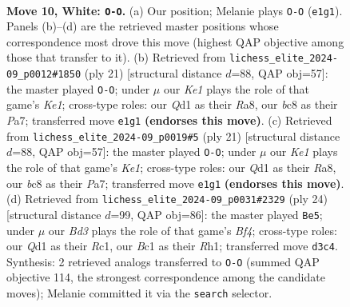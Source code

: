 \documentclass[11pt]{article}
\begin{document}
\clearpage

\begin{figure}[p]\centering
\begin{subfigure}{0.46\textwidth}\centering
\resizebox{\linewidth}{!}{%
\newchessgame
\chessboard[
  setfen={rnb2rk1/1p3ppp/p3pn2/3q4/1b6/2NBPN2/PP3PPP/R1BQK2R w KQ - 0 10},
  showmover=false,
  pgfstyle=straightmove, color=movearrow, markmove={e1-g1}
]}
\caption{}
\end{subfigure}\hfill
\begin{subfigure}{0.46\textwidth}\centering
\resizebox{\linewidth}{!}{%
\newchessgame
\chessboard[
  setfen={r3k2r/pp3ppp/1qn1p3/5b2/1b1P4/1Q2PN2/PP1B1PPP/R3KB1R b KQkq - 0 11},
  showmover=false,
  pgfstyle=straightmove, color=movearrow, markmove={e8-g8}
]}
\caption{}
\end{subfigure}
\\[4pt]
\begin{subfigure}{0.46\textwidth}\centering
\resizebox{\linewidth}{!}{%
\newchessgame
\chessboard[
  setfen={r3k2r/pp3ppp/1qn1p3/5b2/1b1P4/1Q2PN2/PP1B1PPP/R3KB1R b KQkq - 0 11},
  showmover=false,
  pgfstyle=straightmove, color=movearrow, markmove={e8-g8}
]}
\caption{}
\end{subfigure}\hfill
\begin{subfigure}{0.46\textwidth}\centering
\resizebox{\linewidth}{!}{%
\newchessgame
\chessboard[
  setfen={r1b2rk1/pp2ppbp/5np1/3n4/1q3B2/1NN1P3/PP1QBPPP/2R1K2R w K - 0 13},
  showmover=false,
  pgfstyle=straightmove, color=movearrow, markmove={f4-e5}
]}
\caption{}
\end{subfigure}
\caption{\textbf{Move 10, White: \texttt{O-O}.} (a) Our position; Melanie plays \texttt{O-O} (\texttt{e1g1}). Panels (b)--(d) are the retrieved master positions whose correspondence most drove this move (highest QAP objective among those that transfer to it). (b) Retrieved from \texttt{lichess\_elite\_2024-09\_p0012\#1850} (ply 21) [structural distance $d$=88, QAP obj=57]: the master played \texttt{O-O}; under $\mu$ our \emph{Ke1} plays the role of that game's \emph{Ke1}; cross-type roles: our \emph{Q}d1 as their \emph{R}a8, our \emph{b}c8 as their \emph{P}a7; transferred move \texttt{e1g1} \textbf{(endorses this move)}. (c) Retrieved from \texttt{lichess\_elite\_2024-09\_p0019\#5} (ply 21) [structural distance $d$=88, QAP obj=57]: the master played \texttt{O-O}; under $\mu$ our \emph{Ke1} plays the role of that game's \emph{Ke1}; cross-type roles: our \emph{Q}d1 as their \emph{R}a8, our \emph{b}c8 as their \emph{P}a7; transferred move \texttt{e1g1} \textbf{(endorses this move)}. (d) Retrieved from \texttt{lichess\_elite\_2024-09\_p0031\#2329} (ply 24) [structural distance $d$=99, QAP obj=86]: the master played \texttt{Be5}; under $\mu$ our \emph{Bd3} plays the role of that game's \emph{Bf4}; cross-type roles: our \emph{Q}d1 as their \emph{R}c1, our \emph{B}c1 as their \emph{R}h1; transferred move \texttt{d3c4}. Synthesis: 2 retrieved analogs transferred to \texttt{O-O} (summed QAP objective 114, the strongest correspondence among the candidate moves); Melanie committed it via the \texttt{search} selector.}
\label{fig:thought-m18}
\end{figure}
\end{document}
